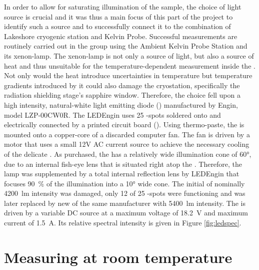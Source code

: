In order to allow for saturating illumination of the sample, the choice of light source is crucial and it was thus a main focus of this part of the project to identify such a source and to successfully connect it to the combination of Lakeshore cryogenic station and \McA{} Kelvin Probe. Successful \spv{} measurements are routinely carried out in the group using the Ambient Kelvin Probe Station and its xenon-lamp. The xenon-lamp is not only a source of light, but also a source of heat and thus unsuitable for the temperature-dependent measurement inside the \McA{}. Not only would the heat introduce uncertainties in temperature but temperature gradients introduced by it could also damage the cryostation, specifically the radiation shielding stage's sapphire window. Therefore, the choice fell upon a high intensity, natural-white light emitting diode (\led{}) manufactured by \led{} Engin, model LZP-00CW0R. The LEDEngin \led{} uses 25 \led{}-spots soldered onto and electrically connected by a printed circuit board (\pcb{}). Using thermo-paste, the \led{} is mounted onto a copper-core of a discarded computer fan. The fan is driven by a motor that uses a small 12V AC current source to achieve the necessary cooling of the delicate \led{}. As purchased, the \led{} has a relatively wide illumination cone of \ang{60}, due to an internal fish-eye lens that is situated right atop the \pcb{}. Therefore, the lamp was supplemented by a total internal reflection lens by LEDEngin that focuses \SI{90}{\percent} of the illumination into a \ang{10} wide cone. The initial \led{} of nominally \SI{4200}{\lumen} intensity was damaged, only 12 of 25 \led{}-spots were functioning and was later replaced by new \led{} of the same manufacturer with \SI{5400}{\lumen} intensity. The \led{} is driven by a variable DC source at a maximum voltage of \SI{18.2}{\volt} and maximum current of \SI{1.5}{\ampere}. Its relative spectral intensity is given in Figure \ref{fig:ledspec}.


\section{Measuring \cpd{} at room temperature}
